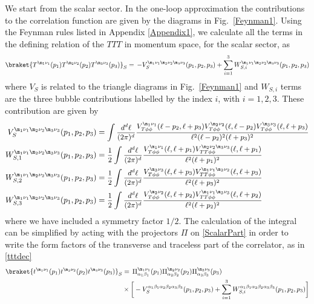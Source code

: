 \documentclass[a4paper,11pt,openright,twoside]{book}
\let\a=\alpha   \let\b=\beta   \let\g=\gamma   \let\d=\delta
\let\n=\nu      \let\x=\xi     \let\p=\pi      \let\r=\rho
\newcommand{\sdfrac}[2]{\mbox{\small$\displaystyle\frac{#1}{#2}$}}
\newcommand{\figref}[1]{Fig.~\ref{#1}}			%
\numberwithin{equation}{section}
\begin{document}
{{We start from the scalar sector. In the one-loop approximation the contributions to the correlation function are given by the diagrams in \figref{Feynman1}. Using the Feynman rules listed in Appendix \ref{Appendix1}, we calculate all the terms in the defining relation of the $TTT$ in momentum space, for the scalar sector, as
\begin{align}
	\braket{T^{\m_1\n_1}(p_1)T^{\m_2\n_2}(p_2)T^{\m_3\n_3}(p_3)}_S=\, -V_{S}^{\m_1\n_1\m_2\n_2\m_3\n_3}(p_1,p_2,p_3)+\sum_{i=1}^3W_{S,i}^{\m_1\n_1\m_2\n_2\m_3\n_3}(p_1,p_2,p_3)\label{ScalarPart}
\end{align}
where $V_S$ is related to the triangle diagrams in \figref{Feynman1} and $W_{S,i}$ terms are the three bubble contributions labelled by the index $i$, with $i=1,2,3$. These contribution are given by
\begin{align}
	V_{S}^{\m_1\n_1\m_2\n_2\m_3\n_3}(p_1,p_2,p_3)& =\int \sdfrac{d^d\ell}{(2\pi)^d}\sdfrac{V^{\m_1\n_1}_{T\phi\phi}(\ell-p_2,\ell+p_3)V^{\m_2\n_2}_{T\phi\phi}(\ell,\ell-p_2)V^{\m_3\n_3}_{T\phi\phi}(\ell,\ell+p_3)}{\ell^2(\ell-p_2)^2(\ell+p_3)^2}\notag\\
	W_{S,1}^{\m_1\n_1\m_2\n_2\m_3\n_3}(p_1,p_2,p_3)& =\sdfrac{1}{2}\int \sdfrac{d^d\ell}{(2\pi)^d}\sdfrac{V^{\m_1\n_1}_{T\phi\phi}(\ell,\ell+p_1)V^{\m_2\n_2\m_3\n_3}_{TT\phi\phi}(\ell,\ell+p_1)}{\ell^2(\ell+p_1)^2}\notag\\
	W_{S,2}^{\m_1\n_1\m_2\n_2\m_3\n_3}(p_1,p_2,p_3)& =\sdfrac{1}{2}\int \sdfrac{d^d\ell}{(2\pi)^d}\sdfrac{V^{\m_3\n_3}_{T\phi\phi}(\ell,\ell+p_3)V^{\m_1\n_1\m_2\n_2}_{TT\phi\phi}(\ell,\ell+p_3)}{\ell^2(\ell+p_3)^2}\notag\\
	W_{S,3}^{\m_1\n_1\m_2\n_2\m_3\n_3}(p_1,p_2,p_3)& =\sdfrac{1}{2}\int \sdfrac{d^d\ell}{(2\pi)^d}\sdfrac{V^{\m_2\n_2}_{T\phi\phi}(\ell,\ell+p_2)V^{\m_1\n_1\m_3\n_3}_{TT\phi\phi}(\ell,\ell+p_2)}{\ell^2(\ell+p_2)^2}
\end{align}
where we have included a symmetry factor $1/2$. The calculation of the integral can be simplified by acting with the projectors $\Pi$ on \eqref{ScalarPart} in order to write the form factors of the transverse and traceless part of the correlator, as in \eqref{tttdec}
\begin{align}
	\braket{t^{\m_1\n_1}(p_1)t^{\m_2\n_2}(p_2)t^{\m_3\n_3}(p_3)}_S&=\,\Pi^{\m_1\n_1}_{\a_1\b_1}(p_1)\Pi^{\m_2\n_2}_{\a_2\b_2}(p_2)\Pi^{\m_3\n_3}_{\a_3\b_3}(p_3)\notag\\
	&\times\bigg[ -V_{S}^{\a_1\b_1\a_2\b_2\a_3\b_3}(p_1,p_2,p_3)+\sum_{i=1}^3W_{S,i}^{\a_1\b_1\a_2\b_2\a_3\b_3}(p_1,p_2,p_3)\bigg]
\end{align}

}}
\end{document}
